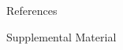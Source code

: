 \documentclass[final]{beamer}
\newlength{\sepwidth}
\newlength{\colwidth}
\newcommand{\separatorcolumn}{\begin{column}{\sepwidth}\end{column}}
\begin{document}
\begin{frame}[t]
\begin{columns}[t]
\begin{column}{\colwidth}

  \begin{block}{References}

    \nocite{*}
    \footnotesize{}

  \end{block}

  \begin{block}{Supplemental Material}

    

  \end{block}

\end{column}
\separatorcolumn
\end{columns}
\end{frame}
\end{document}
